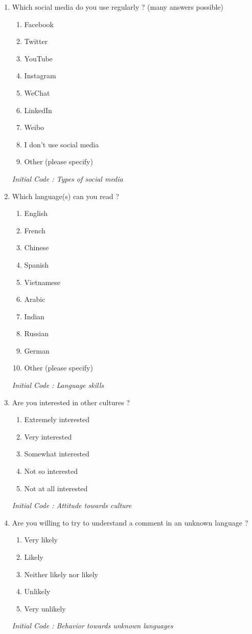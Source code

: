 \documentclass[conference]{IEEEtran}
\begin{document}
\begin{enumerate}
    \item Which social media do you use regularly ? (many answers possible)
    \begin{enumerate}
        \item Facebook
        \item Twitter
        \item YouTube
        \item Instagram
        \item WeChat
        \item LinkedIn
        \item Weibo
        \item I don't use social media
        \item Other (please specify)
    \end{enumerate}
    \textit{Initial Code : Types of social media}
    \item Which language(s) can you read ?
    \begin{enumerate}
        \item English
        \item French
        \item Chinese
        \item Spanish
        \item Vietnamese
        \item Arabic
        \item Indian
        \item Russian
        \item German
        \item Other (please specify)
    \end{enumerate}
    \textit{Initial Code : Language skills}

    \item Are you interested in other cultures ?
    \begin{enumerate}
        \item Extremely interested
        \item Very interested
        \item Somewhat interested
        \item Not so interested
        \item Not at all interested
    \end{enumerate}
    \textit{Initial Code : Attitude towards culture}

    \item Are you willing to try to understand a comment in an unknown language ?
    \begin{enumerate}
        \item Very likely
        \item Likely
        \item Neither likely nor likely
        \item Unlikely
        \item Very unlikely
    \end{enumerate}
    \textit{Initial Code : Behavior towards unknown languages}




\end{enumerate}
\end{document}
